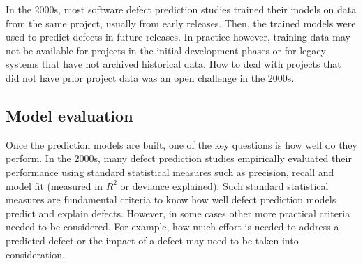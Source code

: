 
In the 2000s, most software defect prediction studies trained their models on data from the same project, usually from early releases. Then, the trained models were used to predict defects in future releases. In practice however, training data may not be available for projects in the initial development phases or for legacy systems that have not archived historical data. How to deal with projects that did not have prior project data was an open challenge in the 2000s.





\subsection{Model evaluation}

Once the prediction models are built, one of the key questions is how well do they perform. In the 2000s, many defect prediction studies empirically evaluated their performance using standard statistical measures such as precision, recall and model fit (measured in $R^2$ or deviance explained). Such standard statistical measures are fundamental criteria to know how well defect prediction models predict and explain defects. However, in some cases other more practical criteria needed to be considered. For example, how much effort is needed to address a predicted defect or the impact of a defect may need to be taken into consideration.

